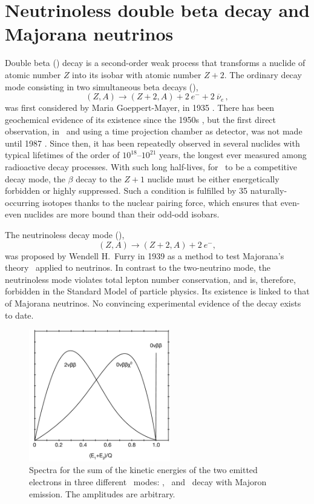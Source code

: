\documentclass{PoS}
\begin{document}
\section{Neutrinoless double beta decay and Majorana neutrinos}
Double beta (\bb) decay is a second-order weak process that transforms a nuclide of atomic number $Z$ into its isobar with atomic number $Z+2$. The ordinary decay mode consisting in two simultaneous beta decays (\bbtnu),
\begin{equation}
(Z,A) \to (Z+2,A) + 2~e^{-} + 2~\overline{\nu}_{e}\, ,
\end{equation}
was first considered by Maria Goeppert-Mayer, in 1935 \cite{GoeppertMayer:1935qp}. There has been geochemical evidence of its existence since the 1950s \cite{Inghram:1950qv}, but the first direct observation, in \SE\ and using a time projection chamber as detector, was not made until 1987 \cite{Elliott:1987kp}. Since then, it has been repeatedly observed in several nuclides with typical lifetimes of the order of $10^{18}$--$10^{21}$ years, the longest ever measured among radioactive decay processes. With such long half-lives, for \bbtnu\ to be a competitive decay mode, the $\beta$ decay to the $Z+1$ nuclide must be either energetically forbidden or highly suppressed. Such a condition is fulfilled by 35 naturally-occurring isotopes thanks to the nuclear pairing force, which ensures that even-even nuclides are more bound than their odd-odd isobars.

The neutrinoless decay mode (\bbonu),
\begin{equation}
(Z,A) \rightarrow (Z+2,A) + 2\ e^{-}, \label{eq:bb0nu}
\end{equation}
was proposed by Wendell H.\ Furry in 1939 \cite{Furry:1939qr} as a method to test Majorana's theory~\cite{Majorana:1937vz} applied to neutrinos. In contrast to the two-neutrino mode, the neutrinoless mode violates total lepton number conservation, and is, therefore, forbidden in the Standard Model of particle physics. Its existence is linked to that of Majorana neutrinos. No convincing experimental evidence of the decay exists to date. 

\begin{figure}
\centering
\includegraphics[width=0.55\textwidth]{img/BBModes.pdf}
\caption{Spectra for the sum of the kinetic energies of the two emitted electrons  in three different \bb\ modes: \bbtnu, \bbonu\ and \bb\ decay with Majoron emission. The amplitudes are arbitrary.} \label{fig:BBModes}
\end{figure}
\end{document}

